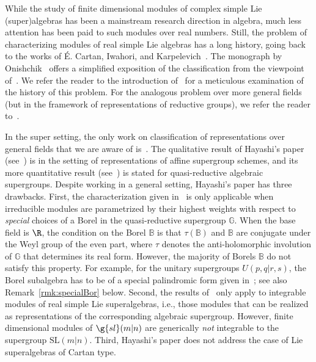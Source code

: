 \documentclass[12pt]{amsart}
\begin{document}
While the study of finite dimensional modules of  
complex simple Lie (super)algebras has been a mainstream research direction in algebra, much less attention has been paid to such modules over real numbers. Still, the problem of characterizing modules of real simple Lie algebras  has a long history, going back to the works of \'{E}. Cartan, Iwahori, and Karpelevich~\cite{Cartan,Iwahori,Karpelevich}. The monograph by Onishchik~\cite{Onishchik} offers a simplified exposition of the classification from the viewpoint of~\cite{Karpelevich}. We refer the reader to the introduction of~\cite{Onishchik} for a meticulous examination of the history of this problem. For the analogous problem over more general fields (but in the framework of representations of reductive groups), we refer the reader to~\cite{Tits}.


In the super setting, the only work on classification of representations over general fields that we are aware of is~\cite{Hayashi}. The qualitative result of Hayashi's paper (see~\cite[Thm 1.2]{Hayashi}) is in the  setting of representations of affine supergroup schemes, and its more quantitative result (see~\cite[Thm 1.7]{Hayashi}) is 
stated for quasi-reductive algebraic supergroups. Despite working in a general setting, Hayashi's paper has three 
drawbacks. First, the characterization given in~\cite[Thm 1.7]{Hayashi} is only applicable when irreducible modules 
are parametrized by their highest weights with respect to \emph{special} choices of a Borel in the quasi-reductive supergroup $\mathbb G$.  When the base field is $\R$, the condition on the Borel  $\mathbb B$ is that
$\tau(\mathbb B)$ and $\mathbb B$ are conjugate under the Weyl group of the even part, where $\tau$ denotes the anti-holomorphic involution of $\mathbb G$ that determines its real form. However, the majority of Borels $\mathbb B$ do not satisfy this property.   For example, for the unitary supergroups $U(p,q|r,s)$, the Borel subalgebra has to be of a special  palindromic form given in~\cite[Example 5.25]{Hayashi}; see also  Remark~\ref{rmk:specialBor} below.  
Second, the results of~\cite{Hayashi} only apply to integrable modules  of real simple Lie superalgebras, i.e., those modules that can be realized as representations of the corresponding  algebraic supergroup. However, finite dimensional modules of $\g{sl}(m|n)$ are generically  \emph{not} integrable to the supergroup $\mathrm{SL}(m|n)$.  Third, Hayashi's paper does not address the case of Lie superalgebras of Cartan type.
\end{document}
